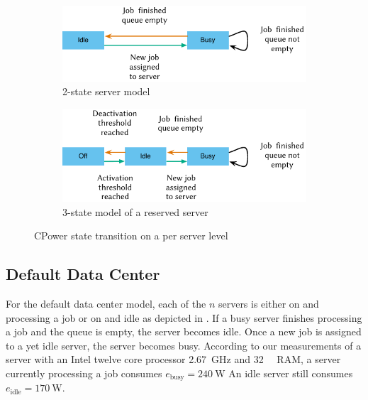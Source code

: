 \begin{figure}
	\begin{subfigure}[b]{\textwidth}
	\centering
	\includegraphics{cloud/data_centers/problem_formulation/figures/idle_busy}
	\caption{2-state server model}\label{fig:sec:cloud:data_centers:problem_formulation:servers:idle_busy}
	\end{subfigure} 
	\begin{subfigure}[b]{\textwidth}
	\centering
	\includegraphics{cloud/data_centers/problem_formulation/figures/idle_busy_off}
	\caption{3-state model of a reserved server}\label{fig:sec:cloud:data_centers:problem_formulation:idle_busy_off}
	\end{subfigure}

	\caption{CPower state transition on a per server level}\label{fig:sec:cloud:data_centers:problem_formulation:servers}
\end{figure}

\subsection{Default Data Center}\label{sec:cloud:data_centers:problem_formulation:default_data_center}
For the default data center model, each of the \(n\) servers is either on and processing a job or on and idle as depicted in .
If a busy server finishes processing a job and the queue is empty, the server becomes idle. Once a new job is assigned to a yet idle server, the server becomes busy.
According to our measurements of a server with an Intel twelve core processor \SI{2.67}{\giga\hertz} and \SI{32}{\giga\byte} RAM, a server currently processing a job consumes \(e_{\text{busy}} = \SI{240}{\watt}\)
An idle server still consumes \(e_{\text{idle}} = \SI{170}{\watt}\).

